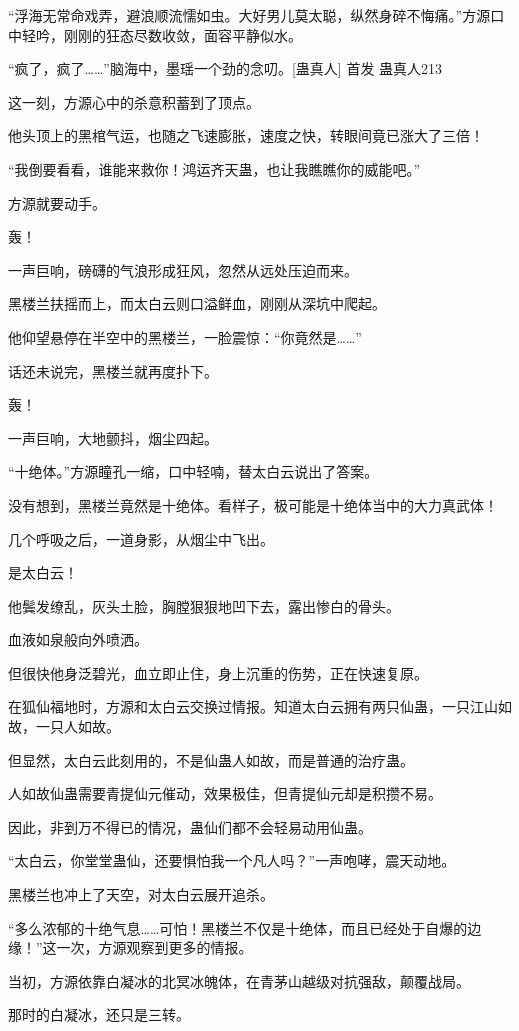 \begin{this_body}
“浮海无常命戏弄，避浪顺流懦如虫。大好男儿莫太聪，纵然身碎不悔痛。”方源口中轻吟，刚刚的狂态尽数收敛，面容平静似水。

“疯了，疯了……”脑海中，墨瑶一个劲的念叨。[蛊真人]  首发 蛊真人213

这一刻，方源心中的杀意积蓄到了顶点。

他头顶上的黑棺气运，也随之飞速膨胀，速度之快，转眼间竟已涨大了三倍！

“我倒要看看，谁能来救你！鸿运齐天蛊，也让我瞧瞧你的威能吧。”

方源就要动手。

轰！

一声巨响，磅礴的气浪形成狂风，忽然从远处压迫而来。

黑楼兰扶摇而上，而太白云则口溢鲜血，刚刚从深坑中爬起。

他仰望悬停在半空中的黑楼兰，一脸震惊：“你竟然是……”

话还未说完，黑楼兰就再度扑下。

轰！

一声巨响，大地颤抖，烟尘四起。

“十绝体。”方源瞳孔一缩，口中轻喃，替太白云说出了答案。

没有想到，黑楼兰竟然是十绝体。看样子，极可能是十绝体当中的大力真武体！

几个呼吸之后，一道身影，从烟尘中飞出。

是太白云！

他鬓发缭乱，灰头土脸，胸膛狠狠地凹下去，露出惨白的骨头。

血液如泉般向外喷洒。

但很快他身泛碧光，血立即止住，身上沉重的伤势，正在快速复原。

在狐仙福地时，方源和太白云交换过情报。知道太白云拥有两只仙蛊，一只江山如故，一只人如故。

但显然，太白云此刻用的，不是仙蛊人如故，而是普通的治疗蛊。

人如故仙蛊需要青提仙元催动，效果极佳，但青提仙元却是积攒不易。

因此，非到万不得已的情况，蛊仙们都不会轻易动用仙蛊。

“太白云，你堂堂蛊仙，还要惧怕我一个凡人吗？”一声咆哮，震天动地。

黑楼兰也冲上了天空，对太白云展开追杀。

“多么浓郁的十绝气息……可怕！黑楼兰不仅是十绝体，而且已经处于自爆的边缘！”这一次，方源观察到更多的情报。

当初，方源依靠白凝冰的北冥冰魄体，在青茅山越级对抗强敌，颠覆战局。

那时的白凝冰，还只是三转。


\end{this_body}
